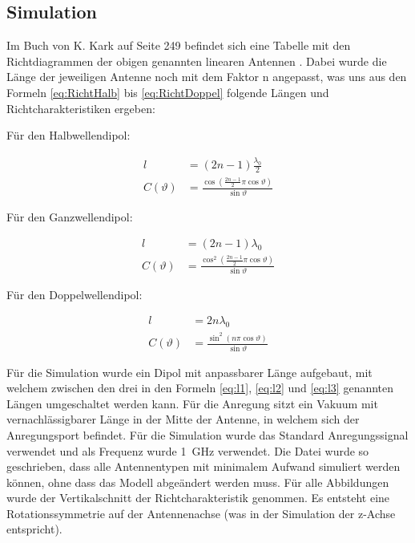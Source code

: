 \subsection{Simulation}

Im Buch von K. Kark auf Seite 249 befindet sich eine Tabelle mit den Richtdiagrammen der obigen genannten linearen Antennen \cite{book}. Dabei wurde die Länge der jeweiligen Antenne noch mit dem Faktor n angepasst, was uns aus den Formeln \ref{eq:RichtHalb} bis \ref{eq:RichtDoppel} folgende Längen und Richtcharakteristiken ergeben:

Für den Halbwellendipol:

\begin{align}
l &= (2n-1)\frac{\lambda_0}{2}\label{eq:l1}\\
C(\vartheta) &= \frac{\cos \left(\frac{2n-1}{2}\pi \cos \vartheta \right)}{\sin \vartheta}
\end{align} 

Für den Ganzwellendipol:

\begin{align}
l &= (2n-1)\lambda_0\label{eq:l2}\\
C(\vartheta) &= \frac{\cos^2 \left(\frac{2n-1}{2}\pi \cos \vartheta \right)}{\sin \vartheta}
\end{align} 

Für den Doppelwellendipol:

\begin{align}
l &= 2n\lambda_0\label{eq:l3}\\
C(\vartheta) &= \frac{\sin^2 \left(n \pi \cos \vartheta \right)}{\sin \vartheta}
\end{align} 

Für die Simulation wurde ein Dipol mit anpassbarer Länge aufgebaut, mit welchem zwischen den drei in den Formeln \ref{eq:l1}, \ref{eq:l2} und \ref{eq:l3} genannten Längen umgeschaltet werden kann. Für die Anregung sitzt ein Vakuum mit vernachlässigbarer Länge in der Mitte der Antenne, in welchem sich der Anregungsport befindet. Für die Simulation wurde das Standard Anregungssignal verwendet und als Frequenz wurde \SI{1}{\giga\hertz} verwendet. Die Datei wurde so geschrieben, dass alle Antennentypen mit minimalem Aufwand simuliert werden können, ohne dass das Modell abgeändert werden muss. Für alle Abbildungen wurde der Vertikalschnitt der Richtcharakteristik genommen. Es entsteht eine Rotationssymmetrie auf der Antennenachse (was in der Simulation der z-Achse entspricht).

\newpage

